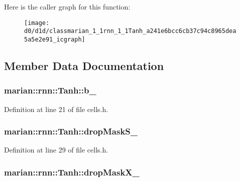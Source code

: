 Here is the caller graph for this function\+:
\nopagebreak
\begin{figure}[H]
\begin{center}
\leavevmode
\texttt{[image: d0/d1d/classmarian\_1\_1rnn\_1\_1Tanh\_a241e6bcc6cb37c94c8965dea5a5e2e91\_icgraph]}
\end{center}
\end{figure}




\subsection{Member Data Documentation}
\subsubsection[{\texorpdfstring{b\+\_\+}{b_}}]{ marian\+::rnn\+::\+Tanh\+::b\+\_\+\hspace{0.3cm}{\ttfamily [private]}}\hypertarget{classmarian_1_1rnn_1_1Tanh_a8270043cd7cbce1118b50835cce625ac}{}\label{classmarian_1_1rnn_1_1Tanh_a8270043cd7cbce1118b50835cce625ac}


Definition at line 21 of file cells.\+h.

\subsubsection[{\texorpdfstring{drop\+Mask\+S\+\_\+}{dropMaskS_}}]{ marian\+::rnn\+::\+Tanh\+::drop\+Mask\+S\+\_\+\hspace{0.3cm}{\ttfamily [private]}}\hypertarget{classmarian_1_1rnn_1_1Tanh_a2d63dd9420ab8be612c3f5a490afe289}{}\label{classmarian_1_1rnn_1_1Tanh_a2d63dd9420ab8be612c3f5a490afe289}


Definition at line 29 of file cells.\+h.

\subsubsection[{\texorpdfstring{drop\+Mask\+X\+\_\+}{dropMaskX_}}]{ marian\+::rnn\+::\+Tanh\+::drop\+Mask\+X\+\_\+\hspace{0.3cm}{\ttfamily [private]}}\hypertarget{classmarian_1_1rnn_1_1Tanh_afd3088eacc5632be9741fd38a36375ed}{}\label{classmarian_1_1rnn_1_1Tanh_afd3088eacc5632be9741fd38a36375ed}


